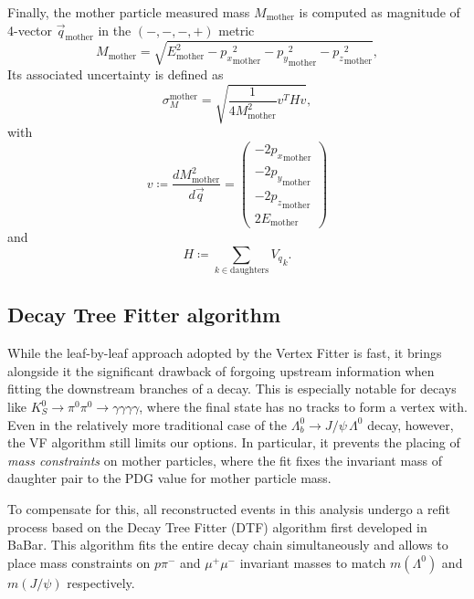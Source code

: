 Finally, the mother particle measured mass $M_\text{mother}$ is computed as magnitude of 4-vector $\vec{q}_\text{mother}$ in the $(-,-,-,+)$ metric
\begin{equation}
	M_\text{mother} = \sqrt{E_\text{mother}^2
	- {p_x}_\text{mother}^2
	- {p_y}_\text{mother}^2
	- {p_z}_\text{mother}^2
	},
\end{equation}
Its associated uncertainty is defined as
\begin{equation}
	\sigma_M^\text{mother} = \sqrt{
		\frac{1}{4 M_\text{mother}^2}
		v^T
		H
		v
	},
\end{equation}
with
\begin{equation}
	v \coloneqq \frac{dM_\text{mother}^2}{d\vec{q}}
	= \begin{pmatrix}
		-2 {p_x}_\text{mother} \\
		-2 {p_y}_\text{mother} \\
		-2 {p_z}_\text{mother} \\
		2 E_\text{mother}
	\end{pmatrix}
\end{equation}
and
\begin{equation}
	H \coloneqq \sum_{k \in \text{daughters}} {V_q}_k.
\end{equation}

\subsection{Decay Tree Fitter algorithm}
\label{sec:3:dtf}
While the leaf-by-leaf approach adopted by the Vertex Fitter is fast, it brings alongside it the significant drawback of forgoing upstream information when fitting the downstream branches of a decay.
This is especially notable for decays like $K_S^0 \rightarrow \pi^0\pi^0 \rightarrow \gamma\gamma\gamma\gamma$, where the final state has no tracks to form a vertex with.
Even in the relatively more traditional case of the $\Lambda_b^0 \rightarrow J/\psi\,\Lambda^0$ decay, however, the VF algorithm still limits our options.
In particular, it prevents the placing of \textit{mass constraints} on mother particles, where the fit fixes the invariant mass of daughter pair to the PDG value for mother particle mass.

To compensate for this, all reconstructed events in this analysis undergo a refit process based on the Decay Tree Fitter (DTF) algorithm \cite{Hulsbergen:2005pu} first developed in BaBar.
This algorithm fits the entire decay chain simultaneously and allows to place mass constraints on $p\pi^-$ and $\mu^+\mu^-$ invariant masses to match $m(\Lambda^0)$ and $m(J/\psi)$ respectively.

